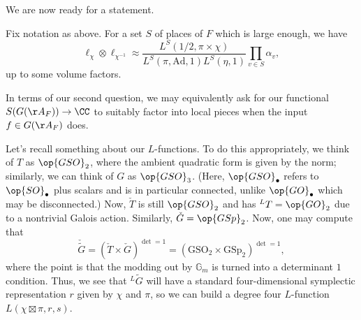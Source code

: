 \documentclass[../notes.tex]{subfiles}
\begin{document}
We are now ready for a statement.
\begin{theorem}
	Fix notation as above. For a set $S$ of places of $F$ which is large enough, we have
	\[\ell_\chi\otimes\ell_{\chi^{-1}}\approx\frac{L^S(1/2,\pi\times\chi)}{L^S(\pi,\mathrm{Ad},1)L^S(\eta,1)}\prod_{v\in S}\alpha_v,\]
	up to some volume factors.
\end{theorem}
\begin{remark}
	In terms of our second question, we may equivalently ask for our functional $S(G(\AA_F))\to\CC$ to suitably factor into local pieces when the input $f\in G(\AA_F)$ does.
\end{remark}
Let's recall something about our $L$-functions. To do this appropriately, we think of $T$ as $\op{GSO}_2$, where the ambient quadratic form is given by the norm; similarly, we can think of $G$ as $\op{GSO}_3$. (Here, $\op{GSO}_\bullet$ refers to $\op{SO}_\bullet$ plus scalars and is in particular connected, unlike $\op{GO}_\bullet$ which may be disconnected.) Now, $\check T$ is still $\op{GSO}_2$ and has $^LT=\op{GO}_2$ due to a nontrivial Galois action. Similarly, $\check G=\op{GSp}_2$. Now, one may compute that
\[\check{\widetilde G}=\left(\check T\times\check G\right)^{\det=1}=\left(\mathrm{GSO}_2\times\mathrm{GSp}_2\right)^{\det=1},\]
where the point is that the modding out by $\mathbb G_m$ is turned into a determinant $1$ condition. Thus, we see that $^L\widetilde G$ will have a standard four-dimensional symplectic representation $r$ given by $\chi$ and $\pi$, so we can build a degree four $L$-function $L(\chi\boxtimes\pi,r,s)$.


\end{document}\]
\end{remark}
\end{document}
